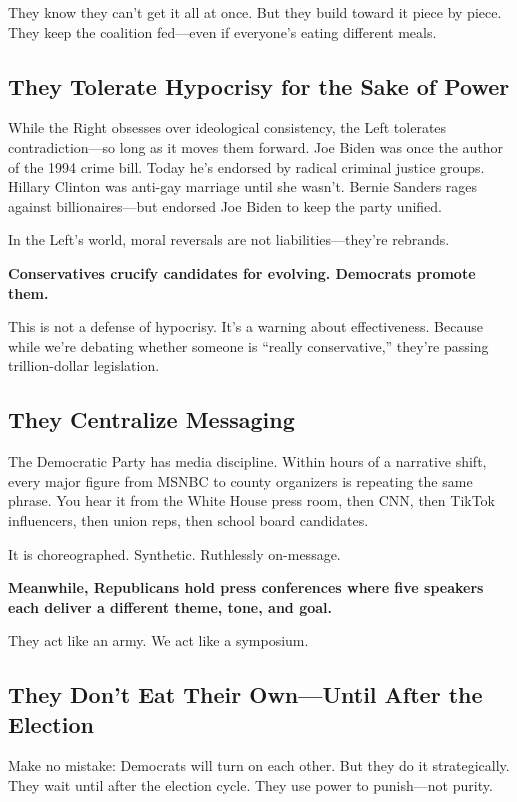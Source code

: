 They know they can’t get it all at once. But they build toward it piece by piece. They keep the coalition fed—even if everyone’s eating different meals.

\subsection*{They Tolerate Hypocrisy for the Sake of Power}

While the Right obsesses over ideological consistency, the Left tolerates contradiction—so long as it moves them forward. Joe Biden was once the author of the 1994 crime bill. Today he’s endorsed by radical criminal justice groups. Hillary Clinton was anti-gay marriage until she wasn’t. Bernie Sanders rages against billionaires—but endorsed Joe Biden to keep the party unified.

In the Left’s world, moral reversals are not liabilities—they’re rebrands.

\textbf{Conservatives crucify candidates for evolving. Democrats promote them.}

This is not a defense of hypocrisy. It’s a warning about effectiveness. Because while we’re debating whether someone is “really conservative,” they’re passing trillion-dollar legislation.

\subsection*{They Centralize Messaging}

The Democratic Party has media discipline. Within hours of a narrative shift, every major figure from MSNBC to county organizers is repeating the same phrase. You hear it from the White House press room, then CNN, then TikTok influencers, then union reps, then school board candidates.

It is choreographed. Synthetic. Ruthlessly on-message.

\textbf{Meanwhile, Republicans hold press conferences where five speakers each deliver a different theme, tone, and goal.}

They act like an army. We act like a symposium.

\subsection*{They Don’t Eat Their Own—Until After the Election}

Make no mistake: Democrats will turn on each other. But they do it strategically. They wait until after the election cycle. They use power to punish—not purity.

